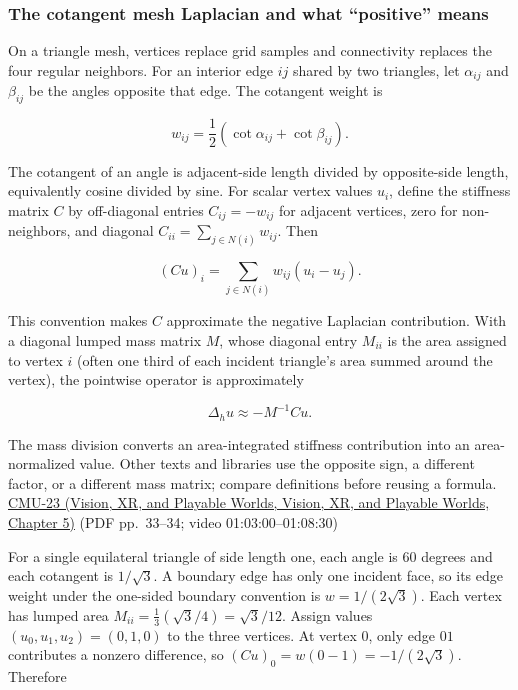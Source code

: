 \subsubsection{The cotangent mesh Laplacian and what ``positive'' means}\label{04-visual-computing-ii-ch030-the-cotangent-mesh-laplacian-and-what-positive-means}

On a triangle mesh, vertices replace grid samples and connectivity replaces the four regular neighbors. For an interior edge \(ij\) shared by two triangles, let \(\alpha_{ij}\) and \(\beta_{ij}\) be the angles opposite that edge. The cotangent weight is

\[
w_{ij}=\frac12(\cot\alpha_{ij}+\cot\beta_{ij}).
\]

The cotangent of an angle is adjacent-side length divided by opposite-side length, equivalently cosine divided by sine. For scalar vertex values \(u_i\), define the stiffness matrix \(C\) by off-diagonal entries \(C_{ij}=-w_{ij}\) for adjacent vertices, zero for non-neighbors, and diagonal \(C_{ii}=\sum_{j\in N(i)}w_{ij}\). Then

\[
(Cu)_i=\sum_{j\in N(i)}w_{ij}(u_i-u_j).
\]

This convention makes \(C\) approximate the negative Laplacian contribution. With a diagonal lumped mass matrix \(M\), whose diagonal entry \(M_{ii}\) is the area assigned to vertex \(i\) (often one third of each incident triangle's area summed around the vertex), the pointwise operator is approximately

\[
\Delta_hu\approx -M^{-1}Cu.
\]

The mass division converts an area-integrated stiffness contribution into an area-normalized value. Other texts and libraries use the opposite sign, a different factor, or a different mass matrix; compare definitions before reusing a formula. \href{../07-Vision-XR-and-Playable-Worlds/main.pdf\#nameddest=04-visual-computing-ii-ch036-cmu-23---physically-based-animation-and-pdes}{CMU-23 (Vision, XR, and Playable Worlds, Vision, XR, and Playable Worlds, Chapter 5)} (PDF pp.~33--34; video 01:03:00--01:08:30)

For a single equilateral triangle of side length one, each angle is \(60\) degrees and each cotangent is \(1/\sqrt{3}\). A boundary edge has only one incident face, so its edge weight under the one-sided boundary convention is \(w=1/(2\sqrt3)\). Each vertex has lumped area \(M_{ii}=\frac13(\sqrt3/4)=\sqrt3/12\). Assign values \((u_0,u_1,u_2)=(0,1,0)\) to the three vertices. At vertex 0, only edge \(01\) contributes a nonzero difference, so \((Cu)_0=w(0-1)=-1/(2\sqrt3)\). Therefore

